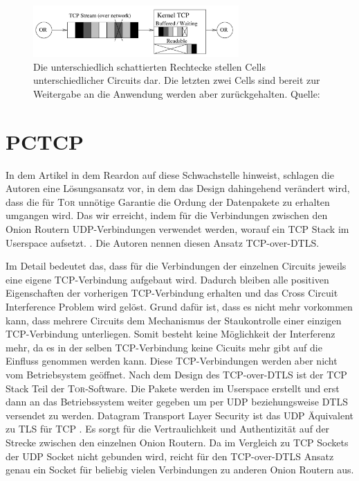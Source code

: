 \documentclass[fleqn,envcountsame,runningheads,10pt,a4paper]{llncs}
\begin{document}
\begin{figure}[h]
  \begin{center}
    \includegraphics[width=0.7\textwidth]{pics/headonlinevanilla.pdf}
    \caption{Die unterschiedlich schattierten Rechtecke stellen Cells unterschiedlicher Circuits dar. Die letzten zwei Cells sind bereit zur Weitergabe an die Anwendung werden aber zurückgehalten. Quelle: \cite{tcp-over-dtls}}
    \label{fig:headonline} 
  \end{center} 
\end{figure}

\section{PCTCP}
\label{sec:pctcp}

In dem Artikel in dem Reardon auf diese Schwachstelle hinweist, schlagen die Autoren eine Lösungsansatz vor, in dem das Design dahingehend verändert wird, dass die für \textsc{Tor} unnötige Garantie die Ordung der Datenpakete zu erhalten umgangen wird. Das wir erreicht, indem für die Verbindungen zwischen den Onion Routern UDP-Verbindungen verwendet werden, worauf ein TCP Stack im Userspace aufsetzt. \cite{tcp-over-dtls}. Die Autoren nennen diesen Ansatz TCP-over-DTLS.

Im Detail bedeutet das, dass für die Verbindungen der einzelnen Circuits jeweils eine eigene TCP-Verbindung aufgebaut wird. Dadurch bleiben alle positiven Eigenschaften der vorherigen TCP-Verbindung erhalten und das Cross Circuit Interference Problem wird gelöst. Grund dafür ist, dass es nicht mehr vorkommen kann, dass mehrere Circuits dem Mechanismus der Staukontrolle einer einzigen TCP-Verbindung unterliegen. Somit besteht keine Möglichkeit der Interferenz mehr, da es in der selben TCP-Verbindung keine Cicuits mehr gibt auf die Einfluss genommen werden kann. Diese TCP-Verbindungen werden aber nicht vom Betriebsystem geöffnet. Nach dem Design des TCP-over-DTLS ist der TCP Stack Teil der \textsc{Tor}-Software. Die Pakete werden im Userspace erstellt und erst dann an das Betriebssystem weiter gegeben um per UDP beziehungsweise DTLS versendet zu werden. Datagram Transport Layer Security ist das UDP Äquivalent zu TLS für TCP \cite{dtls}. Es sorgt für die Vertraulichkeit und Authentizität auf der Strecke zwischen den einzelnen Onion Routern. Da im Vergleich zu TCP Sockets der UDP Socket nicht gebunden wird, reicht für den TCP-over-DTLS Ansatz genau ein Socket für beliebig vielen Verbindungen zu anderen Onion Routern aus.
\end{document}
